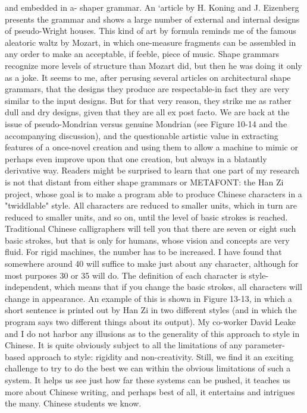and embedded in a- shaper grammar. An `article by H. Koning and J. Eizenberg presents
the grammar and shows a large number of external and internal designs of pseudo-Wright
houses. This kind of art by formula reminds me of the famous aleatoric waltz by Mozart,
in which one-measure fragments can be assembled in any order to make an acceptable, if
feeble, piece of music. Shape grammars recognize more levels of structure than Mozart
did, but then he was doing it only as a joke. It seems to me, after perusing several articles
on architectural shape grammars, that the designs they produce are respectable-in fact
they are very similar to the input designs. But for that very reason, they strike me as
rather dull and dry designs, given that they are all ex post facto. We are back at the issue
of pseudo-Mondrian versus genuine Mondrian (see Figure 10-14 and the accompanying
discussion), and the questionable artistic value in extracting features of a once-novel
creation and using them to allow a machine to mimic or perhaps even improve upon that
one creation, but always in a blatantly derivative way.
        Readers might be surprised to learn that one part of my research is not that distant
from either shape grammars or METAFONT: the Han Zi project, whose goal is to make a
program able to produce Chinese characters in a "twiddlable" style. All characters are
reduced to smaller units, which in turn are reduced to smaller units, and so on, until the
level of basic strokes is reached. Traditional Chinese calligraphers will tell you that there
are seven or eight such basic strokes, but that is only for humans, whose vision and
concepts are very fluid. For rigid machines, the number has to be increased. I have found
that somewhere around 40 will suffice to make just about any character, although for
most purposes 30 or 35 will do. The definition of each character is style-independent,
which means that if you change the basic strokes, all characters will change in
appearance. An example of this is shown in Figure 13-13, in which a short sentence is
printed out by Han Zi in two different styles (and in which the program says two different
things about its output).
        My co-worker David Leake and I do not harbor any illusions as to the generality
of this approach to style in Chinese. It is quite obviously subject to all the limitations of
any parameter-based approach to style: rigidity and non-creativity. Still, we find it an
exciting challenge to try to do the best we can within the obvious limitations of such a
system. It helps us see just how far these systems can be pushed, it teaches us more about
Chinese writing, and perhaps best of all, it entertains and intrigues the many. Chinese
students we know.

